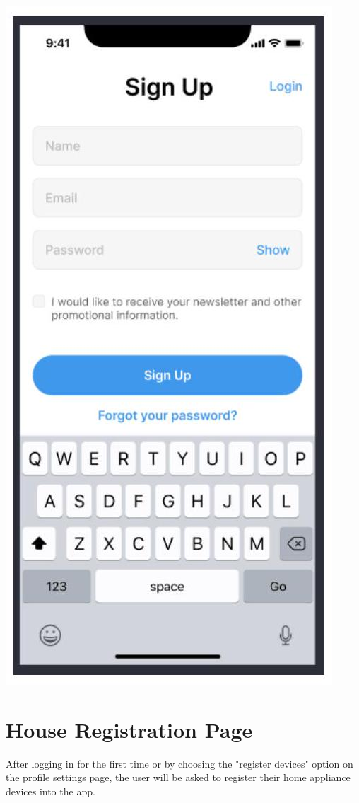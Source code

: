 \documentclass[10pt]{article}
\begin{document}
\includegraphics[max width=\textwidth]{2022_11_16_e80008f3d60227bff292g-5}

\section{House Registration Page}
After logging in for the first time or by choosing the "register devices" option on the profile settings page, the user will be asked to register their home appliance devices into the app.
\end{document}
